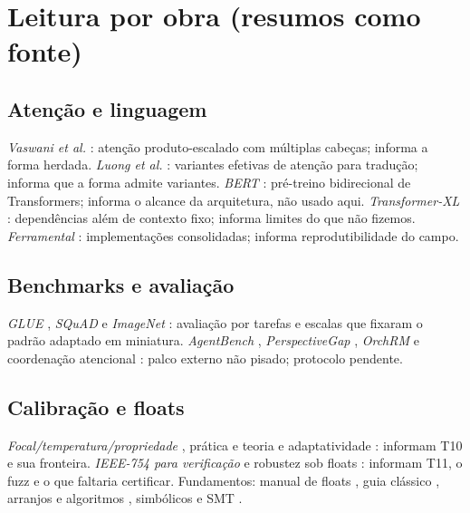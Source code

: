 \section{Leitura por obra (resumos como fonte)}
\subsection{Atenção e linguagem}
\textit{Vaswani et al.} \cite{vaswani2017}: atenção produto-escalado com múltiplas cabeças; informa a forma herdada. \textit{Luong et al.} \cite{luong2015}: variantes efetivas de atenção para tradução; informa que a forma admite variantes. \textit{BERT} \cite{devlin2019}: pré-treino bidirecional de Transformers; informa o alcance da arquitetura, não usado aqui. \textit{Transformer-XL} \cite{dai2019}: dependências além de contexto fixo; informa limites do que não fizemos. \textit{Ferramental} \cite{wolf2020}: implementações consolidadas; informa reprodutibilidade do campo.
\subsection{Benchmarks e avaliação}
\textit{GLUE} \cite{wang2018}, \textit{SQuAD} \cite{rajpurkar2016} e \textit{ImageNet} \cite{deng2009}: avaliação por tarefas e escalas que fixaram o padrão adaptado em miniatura. \textit{AgentBench} \cite{agentbench2023}, \textit{PerspectiveGap} \cite{perspectivegap2026}, \textit{OrchRM} \cite{orchrm2026} e coordenação atencional \cite{orchestrator2025}: palco externo não pisado; protocolo pendente.
\subsection{Calibração e floats}
\textit{Focal/temperatura/propriedade} \cite{komisarenko2024}, prática e teoria \cite{xuan2025} e adaptatividade \cite{xie2024}: informam T10 e sua fronteira. \textit{IEEE-754 para verificação} \cite{bagnara2019} e robustez sob floats \cite{murray2026}: informam T11, o fuzz e o que faltaria certificar. Fundamentos: manual de floats \cite{muller2018}, guia clássico \cite{goldberg1991}, arranjos e algoritmos \cite{harris2020,virtanen2020}, simbólicos e SMT \cite{meurer2017,demoura2008}.

